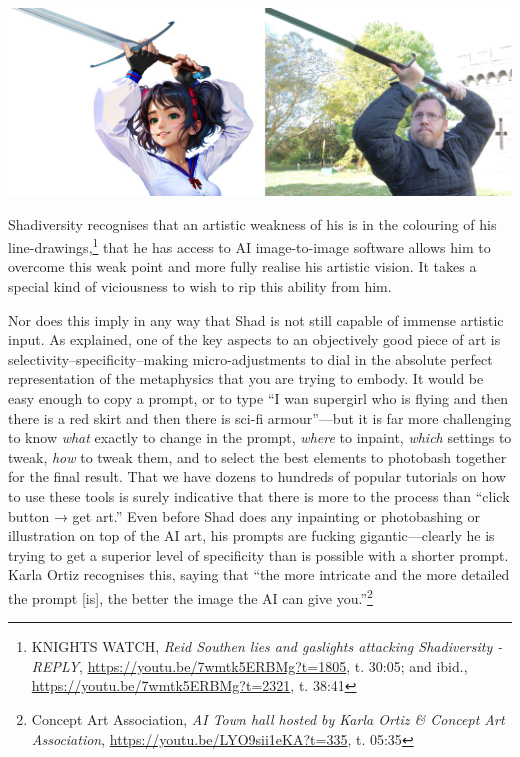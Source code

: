 \documentclass[11pt]{article}
\begin{document}
\begin{center}
\includegraphics[width=.9\linewidth]{./images/shad recreating grip.jpg}
\end{center}

Shadiversity recognises that an artistic weakness of his is in the colouring of his line-drawings,\footnote{KNIGHTS WATCH, \emph{Reid Southen lies and gaslights attacking Shadiversity - REPLY}, \url{https://youtu.be/7wmtk5ERBMg?t=1805}, t. 30:05; and ibid., \url{https://youtu.be/7wmtk5ERBMg?t=2321}, t. 38:41} that he has access to AI image-to-image software allows him to overcome this weak point and more fully realise his artistic vision. It takes a special kind of viciousness to wish to rip this ability from him.

Nor does this imply in any way that Shad is not still capable of immense artistic input. As explained, one of the key aspects to an objectively good piece of art is selectivity--specificity--making micro-adjustments to dial in the absolute perfect representation of the metaphysics that you are trying to embody. It would be easy enough to copy a prompt, or to type ``I wan supergirl who is flying and then there is a red skirt and then there is sci-fi armour''---but it is far more challenging to know \emph{what} exactly to change in the prompt, \emph{where} to inpaint, \emph{which} settings to tweak, \emph{how} to tweak them, and to select the best elements to photobash together for the final result. That we have dozens to hundreds of popular tutorials on how to use these tools is surely indicative that there is more to the process than ``click button → get art.'' Even before Shad does any inpainting or photobashing or illustration on top of the AI art, his prompts are fucking gigantic---clearly he is trying to get a superior level of specificity than is possible with a shorter prompt. Karla Ortiz recognises this, saying that ``the more intricate and the more detailed the prompt [is], the better the image the AI can give you.''\footnote{Concept Art Association, \emph{AI Town hall hosted by Karla Ortiz \& Concept Art Association}, \url{https://youtu.be/LYO9sii1eKA?t=335}, t. 05:35}
\end{document}
